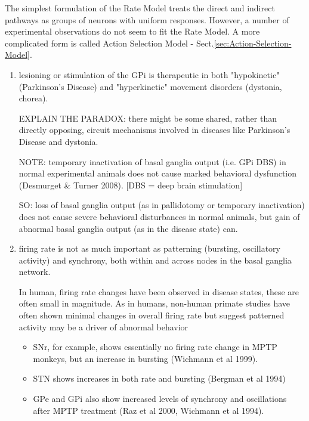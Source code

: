 The simplest formulation of the Rate Model treats the direct and indirect
pathways as groups of neurons with uniform responses.
However, a number of experimental observations do not seem to fit the Rate
Model. A more complicated form is called Action Selection Model -
Sect.\ref{sec:Action-Selection-Model}.

\begin{enumerate}
  
  \item  lesioning or stimulation of the GPi is therapeutic in both
  "hypokinetic" (Parkinson's Disease) and "hyperkinetic" movement disorders
  (dystonia, chorea). 

EXPLAIN THE PARADOX: there might be some shared, rather than directly opposing,
circuit mechanisms involved in diseases like Parkinson's Disease and dystonia.

NOTE: temporary inactivation of basal ganglia output (i.e. GPi DBS) in normal
experimental animals does not cause marked behavioral dysfunction (Desmurget \&
Turner 2008). [DBS = deep brain stimulation]

SO: loss of basal ganglia output (as in pallidotomy or temporary inactivation)
does not cause severe behavioral disturbances in normal animals, but gain of
abnormal basal ganglia output (as in the disease state) can.

  \item firing rate is not as much important as patterning (bursting,
  oscillatory activity) and synchrony, both within and across nodes in the basal
  ganglia network.
  
In human, firing rate changes have been observed in disease states, these are
often small in magnitude. As in humans, non-human primate studies have often
shown minimal changes in overall firing rate but suggest patterned activity may
be a driver of abnormal behavior
\begin{itemize}
  \item  SNr, for example, shows essentially no firing rate change in MPTP
  monkeys, but an increase in bursting (Wichmann et al 1999).
  
  \item STN shows increases in both rate and bursting (Bergman et al 1994)
  
  \item GPe and GPi also show increased levels of synchrony and oscillations
  after MPTP treatment (Raz et al 2000, Wichmann et al 1994).
\end{itemize}



\end{enumerate}
